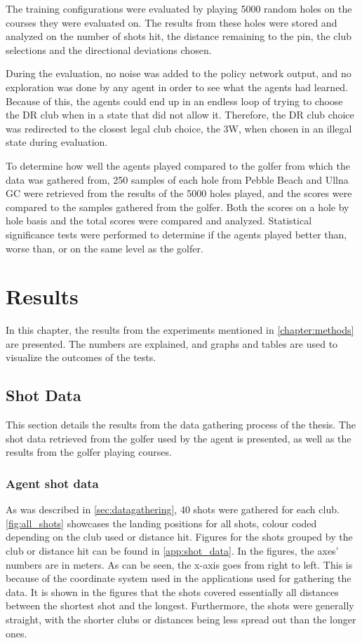 \documentclass{kththesis}
\begin{document}
The training configurations were evaluated by playing 5000 random holes on the courses they were evaluated on. The results from these holes were stored and analyzed on the number of shots hit, the distance remaining to the pin, the club selections and the directional deviations chosen.

During the evaluation, no noise was added to the policy network output, and no exploration was done by any agent in order to see what the agents had learned. Because of this, the agents could end up in an endless loop of trying to choose the DR club when in a state that did not allow it. Therefore, the DR club choice was redirected to the closest legal club choice, the 3W, when chosen in an illegal state during evaluation.

To determine how well the agents played compared to the golfer from which the data was gathered from, 250 samples of each hole from Pebble Beach and Ullna GC were retrieved from the results of the 5000 holes played, and the scores were compared to the samples gathered from the golfer. Both the scores on a hole by hole basis and the total scores were compared and analyzed. Statistical significance tests were performed to determine if the agents played better than, worse than, or on the same level as the golfer.

\chapter{Results}
In this chapter, the results from the experiments mentioned in \autoref{chapter:methods} are presented. The numbers are explained, and graphs and tables are used to visualize the outcomes of the tests.

\section{Shot Data}
This section details the results from the data gathering process of the thesis. The shot data retrieved from the golfer used by the agent is presented, as well as the results from the golfer playing courses.

\subsection{Agent shot data}
As was described in \autoref{sec:datagathering}, 40 shots were gathered for each club. \autoref{fig:all_shots} showcases the landing positions for all shots, colour coded depending on the club used or distance hit. Figures for the shots grouped by the club or distance hit can be found in \autoref{app:shot_data}. In the figures, the axes' numbers are in meters. As can be seen, the x-axis goes from right to left. This is because of the coordinate system used in the applications used for gathering the data. It is shown in the figures that the shots covered essentially all distances between the shortest shot and the longest. Furthermore, the shots were generally straight, with the shorter clubs or distances being less spread out than the longer ones.
\end{document}

